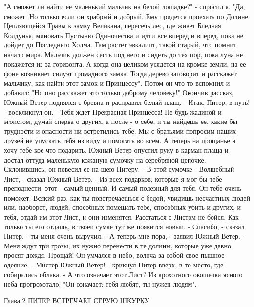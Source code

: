     "А сможет ли найти ее маленький мальчик на белой лошадке?" - 
спросил я.
    "Да, сможет. Но только если он храбрый и добрый. Ему придется 
проехать по Долине Цепляющейся Травы к замку Великана, пересечь лес, 
где живет Бледная Колдунья, миновать Пустыню Одиночества и идти все 
вперед и вперед, пока не дойдет до Последнего Холма. Там растет 
эвкалипт, такой старый, что помнит начало мира. Мальчик должен сесть 
под него и сидеть до тех пор, пока луна не покажется из-за горизонта. 
А когда она целиком усядется на кромке земли, на ее фоне возникнет 
силуэт громадного замка. Тогда дерево заговорит и расскажет мальчику, 
как найти этот замок и Принцессу".
    Потом он что-то вспомнил и добавил: "Но оно расскажет это только 
доброму человеку!"
    Окончив рассказ, Южный Ветер поднялся с бревна и расправил белый 
плащ.
    - Итак, Питер, в путь! - воскликнул он. - Тебя ждет Прекрасная 
Принцесса! Не будь жадиной и эгоистом, думай сперва о других, а после 
- о себе, и ты найдешь ее, какие бы трудности и опасности ни 
встретились тебе. Мы с братьями попросим наших друзей не упускать тебя 
из виду и помогать во всем. А теперь на прощанье я хочу тебе кое-что 
подарить.
    Южный Ветер опустил руку в карман плаща и достал оттуда маленькую 
кожаную сумочку на серебряной цепочке. Склонившись, он повесил ее на 
шею Питеру.
    - В этой сумочке - Волшебный Лист, - сказал Южный Ветер. - Из всех 
подарков, которые я мог бы тебе преподнести, этот - самый ценный. И 
самый полезный для тебя. Он тебе очень поможет. Всякий раз, как ты 
повстречаешься с бедой, увидишь несчастных людей или, наоборот, людей, 
способных помешать тебе, способных убить и других, и тебя, отдай им 
этот Лист, и они изменятся. Расстаться с Листом не бойся. Как только 
ты его отдашь, в твоей сумке тут же появится новый.
    - Спасибо, - сказал Питер, - ты меня очень выручил.
    - А теперь мне пора, - заявил Южный Ветер. - Меня ждут три грозы, 
их нужно перенести в те долины, которые уже давно просят дождя. 
Прощай!
    Он умчался в небо, волоча за собой свое пышное одеяние.
    - Мистер Южный Ветер! - крикнул Питер вверх, в то место, где 
собирались облака. - А что означает этот Лист?
    Из крохотного окошечка ясного неба прогрохотало: "Он означает: 
тебя любят, ты нужен людям".

        Глава 2
        ПИТЕР ВСТРЕЧАЕТ СЕРУЮ ШКУРКУ


